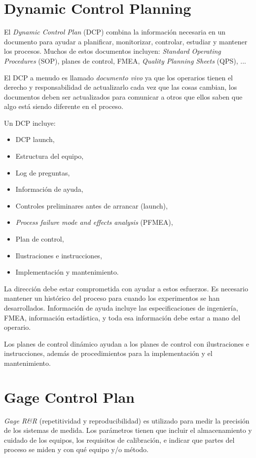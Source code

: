 \documentclass[oneside]{book}
\begin{document}
\section{Dynamic Control Planning}
El \textit{Dynamic Control Plan} (DCP) combina la información necesaria en un documento para ayudar a planificar, monitorizar, controlar, estudiar y mantener los procesos. Muchos de estos documentos incluyen: \textit{Standard Operating Procedures} (SOP), planes de control, FMEA, \textit{Quality Planning Sheets} (QPS), ...

El DCP a menudo es llamado \textit{documento vivo} ya que los operarios tienen el derecho y responsabilidad de actualizarlo cada vez que las cosas cambian, los documentos deben ser actualizados para comunicar a otros que ellos saben que algo está siendo diferente en el proceso.

Un DCP incluye:
\begin{itemize}
	\item DCP launch,
	\item Estructura del equipo,
	\item Log de preguntas,
	\item Información de ayuda,
	\item Controles preliminares antes de arrancar (launch),
	\item \textit{Process failure mode and effects analysis} (PFMEA),
	\item Plan de control,
	\item Ilustraciones e instrucciones,
	\item Implementación y mantenimiento.
\end{itemize}

La dirección debe estar comprometida con ayudar a estos esfuerzos. Es necesario mantener un histórico del proceso para cuando los experimentos se han desarrollados. Información de ayuda incluye las especificaciones de ingeniería, FMEA, información estadística, y toda esa información debe estar a mano del operario.

Los planes de control dinámico ayudan a los planes de control con ilustraciones e instrucciones, además de procedimientos para la implementación y el mantenimiento.

\section{Gage Control Plan}

\textit{Gage R\&R} (repetitividad y reproducibilidad) es utilizado para medir la precisión de los sistemas de medida. Los parámetros tienen que incluir el almacenamiento y cuidado de los equipos, los requisitos de calibración, e indicar que partes del proceso se miden y con qué equipo y/o método.
\end{document}
